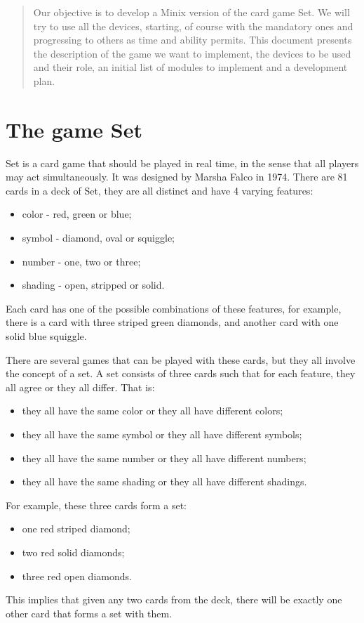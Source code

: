 \documentclass[11pt,a4paper,reqno]{report}
\numberwithin{equation}{section}
\begin{document}



\begin{abstract}
	
Our objective is to develop a Minix version of the card game Set. We will try to use all the devices, starting, of course with the mandatory ones and progressing to others as time and ability permits. This document presents the description of the game we want to implement, the devices to be used and their role, an initial list of modules to implement and a development plan.

\end{abstract}

\tableofcontents

\chapter{The game Set}

Set is a card game that should be played in real time, in the sense that all players may act simultaneously. It was designed by Marsha Falco in 1974. There are 81 cards in a deck of Set, they are all distinct and have 4 varying features:
\begin{itemize}
\item color - red, green or blue;
\item symbol - diamond, oval or squiggle;
\item number - one, two or three;
\item shading - open, stripped or solid.
\end{itemize}
Each card has one of the possible combinations of these features, for example, there is a card with three striped green diamonds, and another card with one solid blue squiggle.

There are several games that can be played with these cards, but they all involve the concept of a set. A set consists of three cards such that for each feature, they all agree or they all differ. That is:
\begin{itemize}
\item they all have the same color or they all have different colors;
\item they all have the same symbol or they all have different symbols;
\item they all have the same number or they all have different numbers;
\item they all have the same shading or they all have different shadings.
\end{itemize}
For example, these three cards form a set:
\begin{itemize}
\item one red striped diamond;
\item two red solid diamonds;
\item three red open diamonds.
\end{itemize}
This implies that given any two cards from the deck, there will be exactly one other card that forms a set with them.
\end{document}
